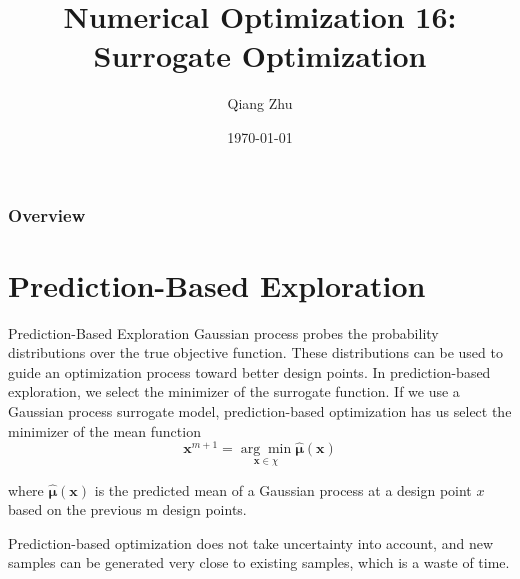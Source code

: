 \documentclass{beamer}
\title[Surrogate Optimization]{Numerical Optimization 16: Surrogate Optimization} %
\author{Qiang Zhu} %
\institute[University of Nevada Las Vegas] %
{
University of Nevada Las Vegas\\ %
\medskip
}
\date{\today} %
\begin{document}
\begin{frame}
\titlepage %
\end{frame}

\begin{frame}
\frametitle{Overview} %
\tableofcontents %
\end{frame}



\section{Prediction-Based Exploration}
\begin{frame}{Prediction-Based Exploration}
Gaussian process probes the probability distributions over the true objective function. These distributions can be used to guide an optimization process toward better design points. In prediction-based exploration, we select the minimizer of the surrogate function. If we use a Gaussian process surrogate model, prediction-based optimization has us select the minimizer of the mean function
\begin{equation*}
    \boldsymbol{x}^{m+1} = \underset{\boldsymbol{x}\in \chi}{\arg\min} \hat{\boldsymbol{\mu}}(\boldsymbol{x})
\end{equation*}

where $\hat{\boldsymbol{\mu}}(\boldsymbol{x})$ is the predicted mean of a Gaussian process at a design point $x$ based on the previous m design points. 

Prediction-based optimization does not take uncertainty into account, and new samples can be generated very close to existing samples, which is a waste of time.
\end{frame}
\end{document}

